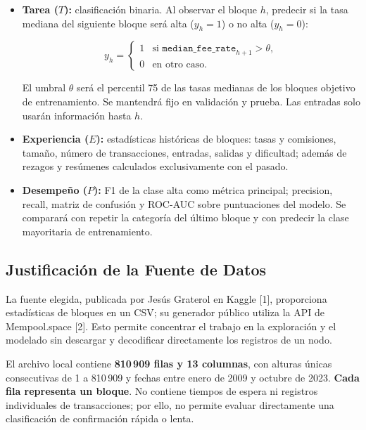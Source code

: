 \documentclass[11pt,a4paper]{article}
\begin{document}
\begin{itemize}

\item \textbf{Tarea ($T$):} clasificación binaria. Al observar el bloque $h$, predecir si la tasa mediana del siguiente bloque será alta ($y_h=1$) o no alta ($y_h=0$):

\begin{equation}
y_h = \begin{cases}
    1 & \text{si }\texttt{median\_fee\_rate}_{h+1}>\theta,\\
    0 & \text{en otro caso.}
\end{cases}
\end{equation}

El umbral $\theta$ será el percentil 75 de las tasas medianas de los bloques objetivo de entrenamiento. Se mantendrá fijo en validación y prueba. Las entradas solo usarán información hasta $h$.

\item \textbf{Experiencia ($E$):} estadísticas históricas de bloques: tasas y comisiones, tamaño, número de transacciones, entradas, salidas y dificultad; además de rezagos y resúmenes calculados exclusivamente con el pasado.

\item \textbf{Desempeño ($P$):} F1 de la clase alta como métrica principal; precision, recall, matriz de confusión y ROC-AUC sobre puntuaciones del modelo. Se comparará con repetir la categoría del último bloque y con predecir la clase mayoritaria de entrenamiento.
\end{itemize}

\subsection{Justificación de la Fuente de Datos}

La fuente elegida, publicada por Jesús Graterol en Kaggle [1], proporciona estadísticas de bloques en un CSV; su generador público utiliza la API de Mempool.space [2]. Esto permite concentrar el trabajo en la exploración y el modelado sin descargar y decodificar directamente los registros de un nodo.

El archivo local contiene \textbf{810\,909 filas y 13 columnas}, con alturas únicas consecutivas de 1 a 810\,909 y fechas entre enero de 2009 y octubre de 2023. \textbf{Cada fila representa un bloque}. No contiene tiempos de espera ni registros individuales de transacciones; por ello, no permite evaluar directamente una clasificación de confirmación rápida o lenta.
\end{document}
